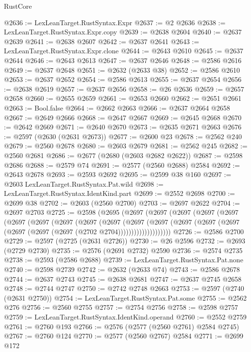 \begin{lexlean}{RustCore}
\begin{coremodule}
@2636 := LexLeanTarget.RustSyntax.Expr
@2637 := @2 @2636
@2638 := LexLeanTarget.RustSyntax.Expr.copy
@2639 := @2638 @2604
@2640 := @2637 @2639
@2641 := @2638 @2607
@2642 := @2637 @2641
@2643 := LexLeanTarget.RustSyntax.Expr.clone
@2644 := @2643 @2610
@2645 := @2637 @2644
@2646 := @2643 @2613
@2647 := @2637 @2646
@2648 := @2586 @2616
@2649 := @2637 @2648
@2651 := @2632 (@2633 @38)
@2652 := @2586 @2610
@2653 := @2637 @2652
@2654 := @2586 @2613
@2655 := @2637 @2654
@2656 := @2638 @2619
@2657 := @2637 @2656
@2658 := @26 @2636
@2659 := @2657 @2658
@2660 := @2655 @2659
@2661 := @2653 @2660
@2662 := @2651 @2661
@2663 := Bool.false
@2664 := @2662 @2663
@2666 := @2637 @2664 @2658
@2667 := @2649 @2666
@2668 := @2647 @2667
@2669 := @2645 @2668
@2670 := @2642 @2669
@2671 := @2640 @2670
@2673 := @2635 @2671 @2663
@2676 := @2597 (@2630 (@2631 @2673))
@2677 := @2600 @23
@2678 := @2562 @240
@2679 := @2560 @2678
@2680 := @2603 @2679
@2681 := @2562 @245
@2682 := @2560 @2681
@2686 := @2677 (@2680 (@2603 @2682 @2622))
@2687 := @2598 @2686
@2688 := @2579 @74
@2691 := @2577 (@2560 @2688) @2584
@2692 := @2643 @2678
@2693 := @2593 @2692
@2695 := @2599 @38 @160
@2697 := @2603 LexLeanTarget.RustSyntax.Pat.wild
@2698 := LexLeanTarget.RustSyntax.IdentKind.part
@2699 := @2552 @2698
@2700 := @2699 @38
@2702 := @2603 (@2560 @2700)
@2703 := @2697 @2622
@2704 := @2697 @2703
@2725 := @2598
    (@2695
      (@2697
        (@2697
          (@2697
            (@2697
              (@2697
                (@2697
                  (@2697
                    (@2697
                      (@2697
                        (@2697
                          (@2697
                            (@2697
                              (@2697
                                (@2697 (@2697 (@2697 (@2697 (@2697 (@2702 @2704))))))))))))))))))))
@2726 := @2586 @2700
@2729 := @2597 (@2725 (@2631 @2726))
@2730 := @26 @2596
@2732 := @2693 (@2729 @2730)
@2735 := @2576 (@2691 @2732) @2590
@2736 := @2574 @2735
@2738 := @2593 (@2586 @2688)
@2739 := LexLeanTarget.RustSyntax.Pat.none
@2740 := @2598 @2739
@2742 := @2632 (@2633 @74)
@2743 := @2586 @2678
@2744 := @2637 @2743
@2745 := @2638 @2681
@2747 := @2637 @2745 @2658
@2748 := @2744 @2747
@2750 := @2742 @2748 @2663
@2753 := @2597 (@2740 (@2631 @2750))
@2754 := LexLeanTarget.RustSyntax.Pat.some
@2755 := @2562 @276
@2756 := @2560 @2755
@2757 := @2754 @2756
@2758 := @2598 @2757
@2759 := LexLeanTarget.RustSyntax.IdentKind.operand
@2760 := @2552 @2759
@2761 := @2760 @193
@2766 := @2576 (@2577 (@2560 @2761) @2584 @2745)
@2767 := @2760 @124
@2770 := @2577 (@2560 @2767) @2584
@2771 := @2699 @172

\end{coremodule}
\end{lexlean}
